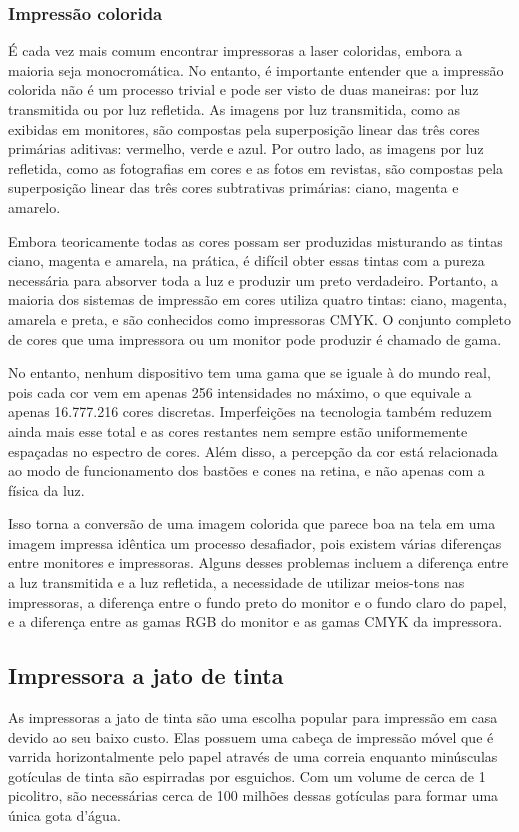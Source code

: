 \documentclass[12pt,a4, oneside, brazil]{article}
\begin{document}
			\subsubsection{Impressão colorida}
			É cada vez mais comum encontrar impressoras a laser coloridas, embora a maioria seja monocromática. No entanto, é importante entender que a impressão colorida não é um processo trivial e pode ser visto de duas maneiras: por luz transmitida ou por luz refletida. As imagens por luz transmitida, como as exibidas em monitores, são compostas pela superposição linear das três cores primárias aditivas: vermelho, verde e azul. Por outro lado, as imagens por luz refletida, como as fotografias em cores e as fotos em revistas, são compostas pela superposição linear das três cores subtrativas primárias: ciano, magenta e amarelo.
			
			Embora teoricamente todas as cores possam ser produzidas misturando as tintas ciano, magenta e amarela, na prática, é difícil obter essas tintas com a pureza necessária para absorver toda a luz e produzir um preto verdadeiro. Portanto, a maioria dos sistemas de impressão em cores utiliza quatro tintas: ciano, magenta, amarela e preta, e são conhecidos como impressoras CMYK. O conjunto completo de cores que uma impressora ou um monitor pode produzir é chamado de gama.
			
			No entanto, nenhum dispositivo tem uma gama que se iguale à do mundo real, pois cada cor vem em apenas 256 intensidades no máximo, o que equivale a apenas 16.777.216 cores discretas. Imperfeições na tecnologia também reduzem ainda mais esse total e as cores restantes nem sempre estão uniformemente espaçadas no espectro de cores. Além disso, a percepção da cor está relacionada ao modo de funcionamento dos bastões e cones na retina, e não apenas com a física da luz.
			
			Isso torna a conversão de uma imagem colorida que parece boa na tela em uma imagem impressa idêntica um processo desafiador, pois existem várias diferenças entre monitores e impressoras. Alguns desses problemas incluem a diferença entre a luz transmitida e a luz refletida, a necessidade de utilizar meios-tons nas impressoras, a diferença entre o fundo preto do monitor e o fundo claro do papel, e a diferença entre as gamas RGB do monitor e as gamas CMYK da impressora.
			
		\subsection{Impressora a jato de tinta}
		As impressoras a jato de tinta são uma escolha popular para impressão em casa devido ao seu baixo custo. Elas possuem uma cabeça de impressão móvel que é varrida horizontalmente pelo papel através de uma correia enquanto minúsculas gotículas de tinta são espirradas por esguichos. Com um volume de cerca de 1 picolitro, são necessárias cerca de 100 milhões dessas gotículas para formar uma única gota d'água.
		
\end{document}
